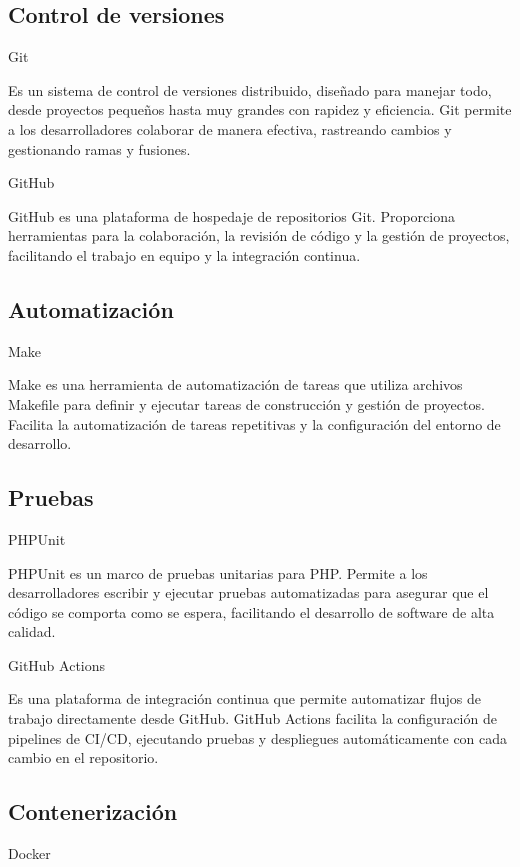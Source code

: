 \subsection*{Control de versiones}

Git

Es un sistema de control de versiones distribuido, diseñado para manejar todo, desde proyectos
pequeños hasta muy grandes con rapidez y eficiencia.
Git permite a los desarrolladores colaborar de manera efectiva, rastreando cambios y gestionando ramas y fusiones.


GitHub

GitHub es una plataforma de hospedaje de repositorios Git.
Proporciona herramientas para la colaboración, la revisión de código y la gestión de proyectos, facilitando el trabajo
en equipo y la integración continua.

\subsection*{Automatización}

Make

Make es una herramienta de automatización de tareas que utiliza archivos Makefile para definir y ejecutar tareas de
construcción y gestión de proyectos.
Facilita la automatización de tareas repetitivas y la configuración del entorno de desarrollo.

\subsection*{Pruebas}

PHPUnit

PHPUnit es un marco de pruebas unitarias para PHP. Permite a los desarrolladores escribir y ejecutar pruebas
automatizadas
para asegurar que el código se comporta como se espera, facilitando el desarrollo de software de alta calidad.

GitHub Actions

Es una plataforma de integración continua que permite automatizar flujos de trabajo directamente desde GitHub.
GitHub Actions facilita la configuración de pipelines de CI/CD, ejecutando pruebas y despliegues automáticamente con
cada cambio en el repositorio.

\subsection*{Contenerización}

Docker

